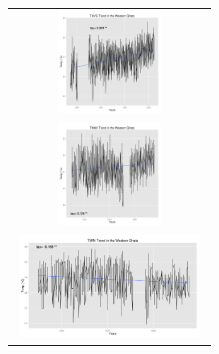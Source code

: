 \documentclass[landscape,final,a0paper,fontscale=0.285]{baposter}
\begin{document}
\begin{poster}
{\begin{multicols}{2}
\begin{minipage}{\linewidth}
\label{tab:name}
 \begin{tabular}{@{}c@{ }}
    \includegraphics[width=5cm,height=2.7cm]{TAVG.png}\\
    \includegraphics[width=5cm,height=2.7cm]{TMAX.png}\\
    \includegraphics[width=5cm,height=2.7cm]{TMIN.png}\\
                       
  \end{tabular}
  \end{minipage} 
\end{multicols}

\noindent\begin{minipage}{\linewidth}
\centering


\end{minipage}}
\end{poster}
\end{document}
